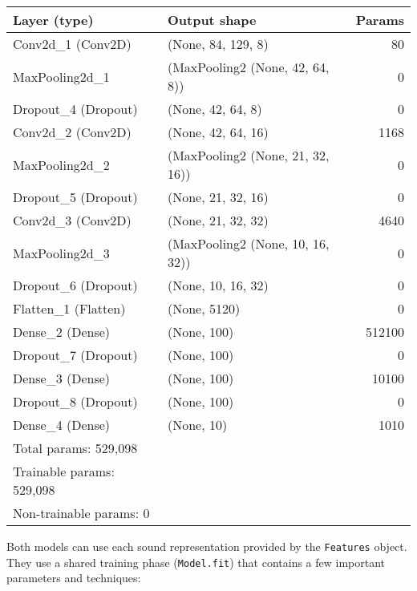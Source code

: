 \begin{center}

  \begin{tabularx}{\textwidth}{l X r}

    \textbf{Layer (type)} & \textbf{Output shape} & \textbf{Params} \\
    \hline
    \hline
    Conv2d\_1 (Conv2D) & (None, 84, 129, 8) & 80 \\
    \hline
    MaxPooling2d\_1 & (MaxPooling2 (None, 42, 64, 8)) & 0 \\
    \hline
    Dropout\_4 (Dropout) & (None, 42, 64, 8) & 0 \\
    \hline
    Conv2d\_2 (Conv2D) & (None, 42, 64, 16) & 1168 \\
    \hline
    MaxPooling2d\_2 & (MaxPooling2 (None, 21, 32, 16)) & 0 \\
    \hline
    Dropout\_5 (Dropout) & (None, 21, 32, 16) & 0 \\
    \hline
    Conv2d\_3 (Conv2D) & (None, 21, 32, 32) & 4640 \\
    \hline
    MaxPooling2d\_3 & (MaxPooling2 (None, 10, 16, 32)) & 0 \\
    \hline
    Dropout\_6 (Dropout) & (None, 10, 16, 32) & 0 \\
    \hline
    Flatten\_1 (Flatten) & (None, 5120) & 0 \\
    \hline
    Dense\_2 (Dense) & (None, 100) & 512100 \\
    \hline
    Dropout\_7 (Dropout) & (None, 100) & 0 \\
    \hline
    Dense\_3 (Dense) & (None, 100) & 10100 \\
    \hline
    Dropout\_8 (Dropout) & (None, 100) & 0 \\
    \hline
    Dense\_4 (Dense) & (None, 10) & 1010 \\
    \hline
    \hline
    Total params: 529,098 & & \\
    Trainable params: 529,098 & & \\
    Non-trainable params: 0 & & \\
    \hline

  \end{tabularx}

  \label{tab:conv2d}

\end{center}

Both models can use each sound representation provided by the \texttt{Features} object. They use a shared training phase (\texttt{Model.fit}) that contains a few important parameters and techniques:


